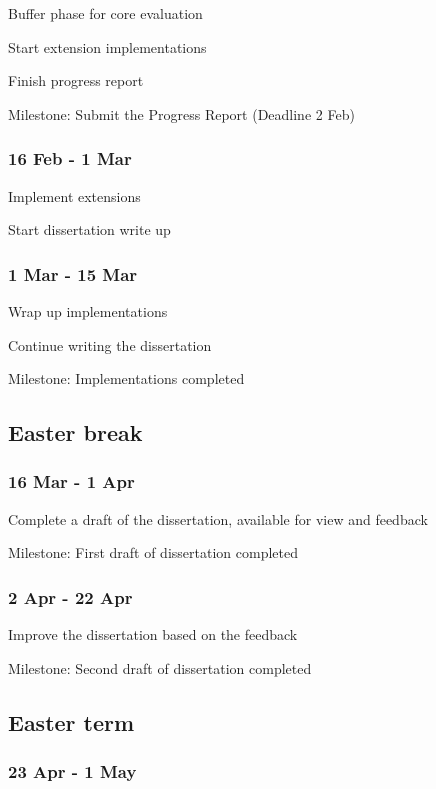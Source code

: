\documentclass[12pt]{article}
\begin{document}
Buffer phase for core evaluation

Start extension implementations

Finish progress report

Milestone: Submit the Progress Report (Deadline 2 Feb)

\subsubsection*{16 Feb - 1 Mar}

Implement extensions

Start dissertation write up

\subsubsection*{1 Mar - 15 Mar}

Wrap up implementations

Continue writing the dissertation

Milestone: Implementations completed

\subsection*{Easter break}

\subsubsection*{16 Mar - 1 Apr}

Complete a draft of the dissertation, available for view and feedback

Milestone: First draft of dissertation completed

\subsubsection*{2 Apr - 22 Apr}

Improve the dissertation based on the feedback

Milestone: Second draft of dissertation completed

\subsection*{Easter term}

\subsubsection*{23 Apr - 1 May}
\end{document}
